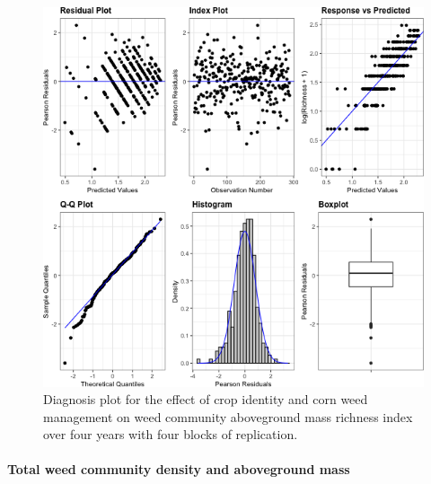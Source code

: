 \documentclass[
]{article}
\begin{document}
\begin{figure}
\centering
\includegraphics{AppendixA-model-diagnosis_files/figure-latex/biom-rich-mod-1.png}
\caption{\label{fig:biom-rich-mod}Diagnosis plot for the effect of crop identity and corn weed management on weed community aboveground mass richness index over four years with four blocks of replication.}
\end{figure}

\hypertarget{total-weed-community-density-and-aboveground-mass}{%
\paragraph*{Total weed community density and aboveground mass}\label{total-weed-community-density-and-aboveground-mass}}
\end{document}

